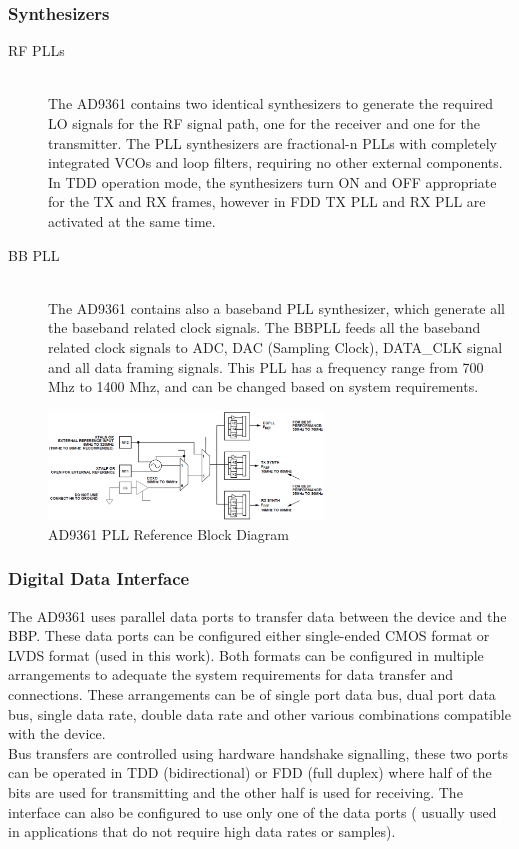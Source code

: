 \subsubsection{Synthesizers}

\begin{description}
	\item[RF PLLs] \hfill \\
	The AD9361 contains two identical synthesizers to generate the required LO
signals for the RF signal path, one for the receiver and one for the
transmitter. The PLL synthesizers are fractional-n PLLs with completely
integrated VCOs and loop filters, requiring no other external components. In TDD
operation mode, the synthesizers turn ON and OFF appropriate for the TX and RX
frames, however in FDD TX PLL and RX PLL are activated at the same time.

	\item[BB PLL] \hfill \\
  The AD9361 contains also a baseband PLL synthesizer,
	which generate all the baseband related clock signals. The BBPLL feeds all the
	baseband related clock signals to ADC, DAC (Sampling Clock), DATA\_CLK signal
	and all data framing signals. This PLL has a frequency range from 700 Mhz to
	1400 Mhz, and can be changed based on system requirements.

\end{description}

\begin{figure}[htbp]
    \centering
    \includegraphics[width=0.65\textwidth]{./figures/pll_ref_block}
    \caption{ AD9361 PLL Reference Block Diagram
    \label{fig:pll}}
\end{figure}

\subsubsection{Digital Data Interface}

The AD9361 uses parallel data ports to transfer data between the device and the
BBP. These data ports can be configured either single-ended CMOS format or LVDS
format (used in this work). Both formats can be configured in multiple
arrangements to adequate the system requirements for data transfer and
connections. These arrangements can be of single port data bus, dual port data
bus, single data rate, double data rate and other various combinations
compatible with the device.\\ Bus transfers are controlled using hardware
handshake signalling, these two ports can be operated in TDD (bidirectional) or
FDD (full duplex) where half of the bits are used for transmitting and the other
half is used for receiving. The interface can also be configured to use only one
of the data ports ( usually used in applications that do not require high data
rates or samples).\\

